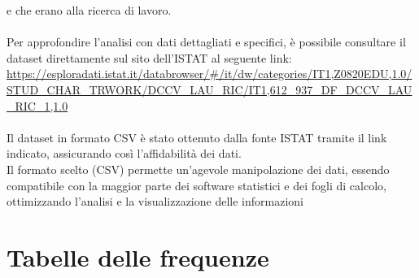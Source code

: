 \documentclass[14pt, openany, titlepage]{report} %
\begin{document}
e che erano alla ricerca di lavoro. \\\\
\noindent
Per approfondire l'analisi con dati dettagliati e specifici, è possibile consultare il dataset direttamente sul sito dell'ISTAT al seguente link:
\url{https://esploradati.istat.it/databrowser/#/it/dw/categories/IT1,Z0820EDU,1.0/STUD_CHAR_TRWORK/DCCV_LAU_RIC/IT1,612_937_DF_DCCV_LAU_RIC_1,1.0}\\\\
\noindent
Il dataset in formato CSV è stato ottenuto dalla fonte ISTAT tramite il link indicato, assicurando così l'affidabilità dei dati.\\
 Il formato scelto (CSV) permette un'agevole manipolazione dei dati, essendo compatibile con la maggior parte dei software statistici e
  dei fogli di calcolo, ottimizzando l'analisi e la visualizzazione delle informazioni

\chapter{Tabelle delle frequenze}
\end{document}
